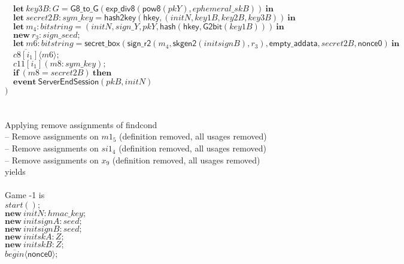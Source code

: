 \documentclass{article}
\newcommand{\cinput}[2]{{#1}({#2})}
\newcommand{\coutput}[2]{\overline{#1}\langle{#2}\rangle}
\newcommand{\kw}[1]{\mathbf{#1}}
\newcommand{\kwf}[1]{\mathsf{#1}}
\newcommand{\var}[1]{\mathit{#1}}
\newcommand{\kwt}[1]{\mathit{#1}}
\newcommand{\kwc}[1]{\mathit{#1}}
\begin{document}
\begin{tabbing}
\>$\quad \kw{let}\ \var{key3B}: \kwt{G} = \kwf{G8{\_}to{\_}G}(\kwf{exp{\_}div8}(\kwf{pow8}(\var{pkY}), \var{ephemeral{\_}skB}))\ \kw{in}$\\
\>$\quad \kw{let}\ \var{secret2B}: \kwt{sym{\_}key} = \kwf{hash2key}(\kwf{hkey}, \kwf{}(\var{initN}, \var{key1B}, \var{key2B}, \var{key3B}))\ \kw{in}$\\
\>$\quad \kw{let}\ \var{m}_{4}: \kwt{bitstring} = \kwf{}(\var{initN}, \var{sign{\_}Y}, \var{pkY}, \kwf{hash}(\kwf{hkey}, \kwf{G2bit}(\var{key1B})))\ \kw{in}$\\
\>$\quad \kw{new}\ \var{r}_{3}: \kwt{sign{\_}seed};$\\
\>$\quad \kw{let}\ \var{m6}: \kwt{bitstring} = \kwf{secret{\_}box}(\kwf{sign{\_}r2}(\var{m}_{4}, \kwf{skgen2}(\var{initsignB}), \var{r}_{3}), \kwf{empty{\_}addata}, \var{secret2B}, \kwf{nonce0})\ \kw{in}$\\
\>$\quad \coutput{\kwc{c8}[\var{i}_{1}]}{\var{m6}};$\\
\>$\quad \cinput{\kwc{c11}[\var{i}_{1}]}{\var{m8}: \kwt{sym{\_}key}};$\\
\>$\quad \kw{if}\ (\var{m8}  =  \var{secret2B})\ \kw{then}$\\
\>$\quad \kw{event}\ \kwf{ServerEndSession}(\var{pkB}, \var{initN})$\\
\>$)$\\
\\
\\
Applying remove assignments of findcond\\
\quad -- Remove assignments on $\var{m1}_{5}$ (definition removed, all usages removed)\\
\quad -- Remove assignments on $\var{si1}_{4}$ (definition removed, all usages removed)\\
\quad -- Remove assignments on $\var{x}_{9}$ (definition removed, all usages removed)\\
yields\\
\\
Game -1 is\\
\>$\cinput{\kwc{start}}{};$\\
\>$\kw{new}\ \var{initN}: \kwt{hmac{\_}key};$\\
\>$\kw{new}\ \var{initsignA}: \kwt{seed};$\\
\>$\kw{new}\ \var{initsignB}: \kwt{seed};$\\
\>$\kw{new}\ \var{initskA}: \kwt{Z};$\\
\>$\kw{new}\ \var{initskB}: \kwt{Z};$\\
\>$\coutput{\kwc{begin}}{\kwf{nonce0}};$\\

\end{tabbing}
\end{document}

